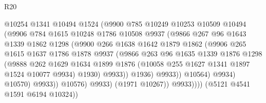 \begin{lexlean}{R20}
\begin{coremodule}
                            @10254
                            @1341
                            @10494
                            @1524
                            (@9900
                              @785
                              @10249
                              @10253
                              @10509
                              @10494
                              (@9906
                                @784
                                @1615
                                @10248
                                @1786
                                @10508
                                @9937
                                (@9866
                                  @267
                                  @96
                                  @1643
                                  @1339
                                  @1862
                                  @1298
                                  (@9900
                                    @266
                                    @1638
                                    @1642
                                    @1879
                                    @1862
                                    (@9906
                                      @265
                                      @1615
                                      @1637
                                      @1786
                                      @1878
                                      @9937
                                      (@9866
                                        @263
                                        @96
                                        @1635
                                        @1339
                                        @1876
                                        @1298
                                        (@9888
                                          @262
                                          @1629
                                          @1634
                                          @1899
                                          @1876
                                          (@10058 @255 @1627 @1341 @1897 @1524 @10077 @9934)
                                          @1930)
                                        @9933))
                                    @1936)
                                  @9933))
                              @10564)
                            @9934)
                          @10570)
                        @9933))
                    @10576)
                  @9933)
                (@1971 @10267))
              @9933))))
      (@5121 @4541 @1591 @6194 @10324))

\end{coremodule}
\end{lexlean}
